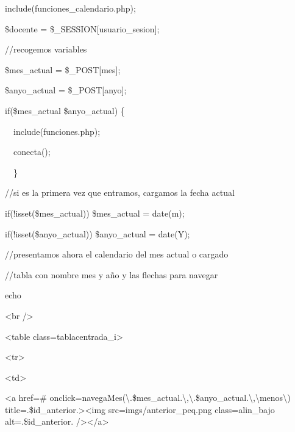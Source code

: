 \documentclass[a4paper]{article}
\begin{document}
include({\textquotesingle}funciones\_calendario.php{\textquotesingle}); 

\$docente =
\$\_SESSION[{\textquotesingle}usuario\_sesion{\textquotesingle}]; 

//recogemos variables 

\$mes\_actual = \$\_POST[{\textquotesingle}mes{\textquotesingle}]; 

\$anyo\_actual = \$\_POST[{\textquotesingle}anyo{\textquotesingle}]; 

if(\$mes\_actual {\textbar}{\textbar} \$anyo\_actual) \{ 

\ \ include({\textquotesingle}funciones.php{\textquotesingle}); 

\ \ conecta(); 

\ \ \} 

//si es la primera vez que entramos, cargamos la fecha actual 

if(!isset(\$mes\_actual)) \$mes\_actual =
date({\textquotesingle}m{\textquotesingle}); 

if(!isset(\$anyo\_actual)) \$anyo\_actual =
date({\textquotesingle}Y{\textquotesingle}); 

//presentamos ahora el calendario del mes actual o cargado 

//tabla con nombre mes y año y las flechas para navegar 

echo {\textquotesingle} 

{\textless}br /{\textgreater} 

{\textless}table
class={\textquotedbl}tablacentrada\_i{\textquotedbl}{\textgreater} 

{\textless}tr{\textgreater} 

{\textless}td{\textgreater} 

{\textless}a href={\textquotedbl}\#{\textquotedbl}
onclick={\textquotedbl}navegaMes({\textbackslash}{\textquotesingle}{\textquotesingle}.\$mes\_actual.{\textquotesingle}{\textbackslash}{\textquotesingle},{\textbackslash}{\textquotesingle}{\textquotesingle}.\$anyo\_actual.{\textquotesingle}{\textbackslash}{\textquotesingle},{\textbackslash}{\textquotesingle}menos{\textbackslash}{\textquotesingle}){\textquotedbl}
title={\textquotedbl}{\textquotesingle}.\$id\_anterior.{\textquotesingle}{\textquotedbl}{\textgreater}{\textless}img
src={\textquotedbl}imgs/anterior\_peq.png{\textquotedbl}
class={\textquotedbl}alin\_bajo{\textquotedbl}
alt={\textquotedbl}{\textquotesingle}.\$id\_anterior.{\textquotesingle}{\textquotedbl}
/{\textgreater}{\textless}/a{\textgreater} 
\end{document}
